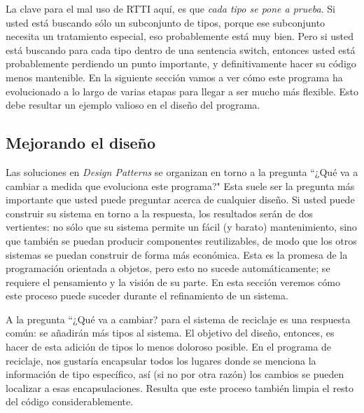 La clave para el mal uso de RTTI aquí, es que \textit{cada tipo se pone a prueba}. Si usted está buscando sólo un subconjunto de tipos, porque ese subconjunto necesita un tratamiento especial, eso probablemente está muy bien. Pero si usted está buscando para cada tipo dentro de una sentencia switch, entonces usted está probablemente perdiendo un punto importante, y definitivamente hacer su código menos mantenible. En la siguiente sección vamos a ver cómo este programa ha evolucionado a lo largo de varias etapas para llegar a ser mucho más flexible. Esto debe resultar un ejemplo valioso en el diseño del programa.     \newline



\subsection*{Mejorando el diseño}
\label{subsec:med}



Las soluciones en \textit{Design Patterns} se organizan en torno a la pregunta “¿Qué va a cambiar a medida que evoluciona este programa?" Esta suele ser la pregunta más importante que usted puede preguntar acerca de cualquier diseño. Si usted puede construir su sistema en torno a la respuesta, los resultados serán de dos vertientes: no sólo que su sistema permite un fácil (y barato) mantenimiento, sino que también se puedan producir componentes reutilizables, de modo que los otros sistemas se puedan construir de forma más económica. Esta es la promesa de la programación orientada a objetos, pero esto no sucede automáticamente; se requiere el pensamiento y la visión de su parte. En esta sección veremos cómo este proceso puede suceder durante el refinamiento de un sistema.    \newline


A la pregunta “¿Qué va a cambiar? para el sistema de reciclaje es una respuesta común: se añadirán más tipos al sistema. El objetivo del diseño, entonces, es hacer de esta adición de tipos lo menos doloroso posible. En el programa de reciclaje, nos gustaría encapsular todos los lugares donde se menciona la información de tipo específico, así (si no por otra razón) los cambios se pueden localizar a esas encapsulaciones. Resulta que este proceso también limpia el resto del código considerablemente.  \newline

